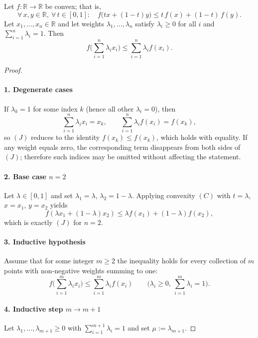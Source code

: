 \begin{theorem}
Let \(f:\mathbb R\to\mathbb R\) be convex; that is,
\[
\forall\,x,y\in\mathbb R,\ \forall\,t\in[0,1]:
\quad f\big(tx+(1-t)y\big)\le t\,f(x)+(1-t)\,f(y). \tag{C}
\]
Let \(x_{1},\dots ,x_{n}\in\mathbb R\) and let weights \(\lambda_{1},\dots ,\lambda_{n}\) satisfy  
\(\lambda_{i}\ge0\) for all \(i\) and \(\sum_{i=1}^{n}\lambda_{i}=1\).  
Then
\[
f\!\Big(\sum_{i=1}^{n}\lambda_{i}x_{i}\Big)\le \sum_{i=1}^{n}\lambda_{i}f(x_{i}). \tag{J}
\]
\end{theorem}

\begin{proof}
\paragraph{1. Degenerate cases}  
If \(\lambda_{k}=1\) for some index \(k\) (hence all other \(\lambda_{i}=0\)), then
\[
\sum_{i=1}^{n}\lambda_{i}x_{i}=x_{k},\qquad
\sum_{i=1}^{n}\lambda_{i}f(x_{i})=f(x_{k}),
\]
so \((J)\) reduces to the identity \(f(x_{k})\le f(x_{k})\), which holds with equality.
If any weight equals zero, the corresponding term disappears from both sides of \((J)\);
therefore such indices may be omitted without affecting the statement.

\paragraph{2. Base case \(n=2\)}  
Let \(\lambda\in[0,1]\) and set \(\lambda_{1}=\lambda\), \(\lambda_{2}=1-\lambda\).
Applying convexity \((C)\) with \(t=\lambda\), \(x=x_{1}\), \(y=x_{2}\) yields
\[
f(\lambda x_{1}+(1-\lambda)x_{2})
\le \lambda f(x_{1})+(1-\lambda)f(x_{2}),
\]
which is exactly \((J)\) for \(n=2\).

\paragraph{3. Inductive hypothesis}  
Assume that for some integer \(m\ge2\) the inequality holds for every collection of
\(m\) points with non‑negative weights summing to one:
\[
f\!\Big(\sum_{i=1}^{m}\lambda_{i}x_{i}\Big)
\le \sum_{i=1}^{m}\lambda_{i}f(x_{i})
\qquad
\bigl(\lambda_{i}\ge0,\ \sum_{i=1}^{m}\lambda_{i}=1\bigr). \tag{IH}
\]

\paragraph{4. Inductive step \(m\to m+1\)}  
Let \(\lambda_{1},\dots ,\lambda_{m+1}\ge0\) with \(\sum_{i=1}^{m+1}\lambda_{i}=1\) and set
\(\mu:=\lambda_{m+1}\).


\end{proof}
